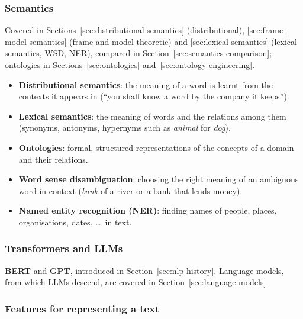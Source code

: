 \subsubsection{Semantics}

Covered in Sections~\ref{sec:distributional-semantics} (distributional),
\ref{sec:frame-model-semantics} (frame and model-theoretic) and
\ref{sec:lexical-semantics} (lexical semantics, WSD, NER), compared in
Section~\ref{sec:semantics-comparison}; ontologies in Sections~\ref{sec:ontologies}
and~\ref{sec:ontology-engineering}.

\begin{itemize}[nosep]
  \item \textbf{Distributional semantics}: the meaning of a word is learnt from the
        contexts it appears in (``you shall know a word by the company it keeps'').
  \item \textbf{Lexical semantics}: the meaning of words and the relations among them
        (synonyms, antonyms, hypernyms such as \emph{animal} for \emph{dog}).
  \item \textbf{Ontologies}: formal, structured representations of the concepts of a
        domain and their relations.
  \item \textbf{Word sense disambiguation}: choosing the right meaning of an ambiguous
        word in context (\emph{bank} of a river or a bank that lends money).
  \item \textbf{Named entity recognition (NER)}: finding names of people, places,
        organisations, dates, \ldots\ in text.
\end{itemize}

\subsubsection{Transformers and LLMs}

\textbf{BERT} and \textbf{GPT}, introduced in Section~\ref{sec:nlp-history}. Language
models, from which LLMs descend, are covered in Section~\ref{sec:language-models}.

\subsubsection{Features for representing a text}

